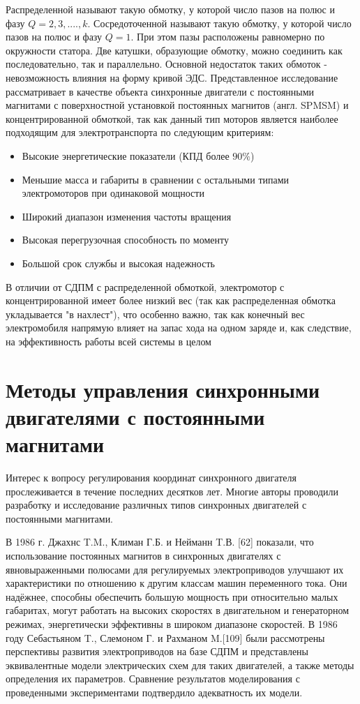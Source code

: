 Распределенной называют такую обмотку, у которой число пазов на полюс и фазу $Q = 2, 3,...., k$.
Сосредоточенной называют такую обмотку, у которой число пазов на полюс и фазу $Q = 1$. При этом пазы расположены равномерно по окружности статора. Две катушки, образующие обмотку, можно соединить как последовательно, так и параллельно. Основной недостаток таких обмоток - невозможность влияния на форму кривой ЭДС.
Представленное исследование рассматривает в качестве объекта синхронные двигатели с постоянными магнитами с поверхностной установкой постоянных магнитов (англ. SPMSM) и концентрированной обмоткой, так как данный тип моторов является наиболее подходящим для электротранспорта по следующим критериям: 

\begin{itemize}
\item Высокие энергетические показатели (КПД более $90\%$)
\item Меньшие масса и габариты в сравнении с остальными типами электромоторов при одинаковой мощности
\item Широкий диапазон изменения частоты вращения
\item Высокая перегрузочная способность по моменту
\item Большой срок службы и высокая надежность
\end{itemize}

В отличии от СДПМ с распределенной обмоткой, электромотор с концентрированной имеет более низкий вес (так как распределенная обмотка укладывается "в нахлест"), что особенно важно, так как конечный вес электромобиля напрямую влияет на запас хода на одном заряде и, как следствие, на эффективность работы всей системы в целом

\section{Методы управления синхронными двигателями с постоянными магнитами} \label{sec:ch1/sec4}

Интерес к вопросу регулирования координат синхронного двигателя прослеживается в течение последних десятков лет. Многие авторы проводили разработку и исследование различных типов синхронных двигателей с постоянными магнитами.

В 1986 г. Джахнс T.M., Климан Г.Б. и Нейманн T.В. [62] показали, что использование постоянных магнитов в синхронных двигателях с явновыраженными полюсами для регулируемых электроприводов улучшают их характеристики по отношению к другим классам машин переменного тока. Они надёжнее, способны обеспечить большую мощность при относительно малых габаритах, могут работать на высоких скоростях в двигательном и генераторном режимах, энергетически эффективны в широком диапазоне скоростей.
В 1986 году Себастьяном T., Слемоном Г. и Рахманом M.[109] были рассмотрены перспективы развития электроприводов на базе СДПМ и представлены эквивалентные модели электрических схем для таких двигателей, а также методы определения их параметров. Сравнение результатов моделирования с проведенными экспериментами подтвердило адекватность их модели. 

